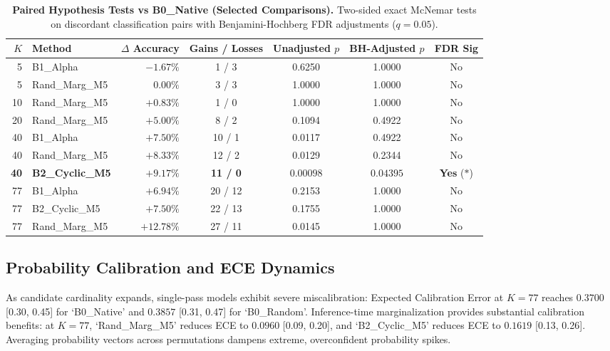 \documentclass[10pt]{article}
\begin{document}
\begin{table}[H]
\centering
\small
\caption{\textbf{Paired Hypothesis Tests vs B0\_Native (Selected Comparisons).} Two-sided exact McNemar tests on discordant classification pairs with Benjamini-Hochberg FDR adjustments ($q=0.05$).}
\label{tab:significance_summary}
\begin{tabular}{r l r c c c c}
\toprule
$K$ & Method & $\Delta$ Accuracy & Gains / Losses & Unadjusted $p$ & BH-Adjusted $p$ & FDR Sig \\
\midrule
5  & B1\_Alpha     & $-1.67\%$ & 1 / 3  & 0.6250   & 1.0000 & No \\
5  & Rand\_Marg\_M5 & $0.00\%$  & 3 / 3  & 1.0000   & 1.0000 & No \\
10 & Rand\_Marg\_M5 & $+0.83\%$ & 1 / 0  & 1.0000   & 1.0000 & No \\
20 & Rand\_Marg\_M5 & $+5.00\%$ & 8 / 2  & 0.1094   & 0.4922 & No \\
40 & B1\_Alpha     & $+7.50\%$ & 10 / 1 & 0.0117   & 0.4922 & No \\
40 & Rand\_Marg\_M5 & $+8.33\%$ & 12 / 2 & 0.0129   & 0.2344 & No \\
\textbf{40} & \textbf{B2\_Cyclic\_M5} & $\mathbf{+9.17\%}$ & \textbf{11 / 0} & $\mathbf{0.00098}$ & $\mathbf{0.04395}$ & \textbf{Yes} ($*$) \\
77 & B1\_Alpha     & $+6.94\%$ & 20 / 12 & 0.2153   & 1.0000 & No \\
77 & B2\_Cyclic\_M5 & $+7.50\%$ & 22 / 13 & 0.1755   & 1.0000 & No \\
77 & Rand\_Marg\_M5 & $+12.78\%$ & 27 / 11 & 0.0145   & 1.0000 & No \\
\bottomrule
\end{tabular}
\end{table}

\subsection{Probability Calibration and ECE Dynamics}

As candidate cardinality expands, single-pass models exhibit severe miscalibration: Expected Calibration Error at $K=77$ reaches $0.3700$ [0.30, 0.45] for `B0\_Native' and $0.3857$ [0.31, 0.47] for `B0\_Random'. Inference-time marginalization provides substantial calibration benefits: at $K=77$, `Rand\_Marg\_M5' reduces ECE to $0.0960$ [0.09, 0.20], and `B2\_Cyclic\_M5' reduces ECE to $0.1619$ [0.13, 0.26]. Averaging probability vectors across permutations dampens extreme, overconfident probability spikes.
\end{document}
